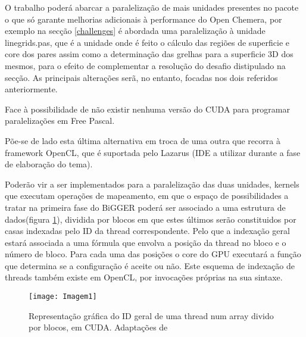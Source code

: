  O trabalho poderá abarcar a paralelização de mais unidades presentes no pacote o que só garante melhorias adicionais à performance do Open Chemera, por exemplo na secção \ref{challenges} é abordada uma paralelização à unidade linegrids.pas, que é a unidade onde é feito o cálculo das regiões de superficie e core dos pares assim como a determinação das grelhas para a superficie 3D dos mesmos, para o efeito de complementar a resolução do desafio distipulado na secção. As principais alterações serã, no entanto, focadas nos dois referidos anteriormente.
 
Face à possibilidade de não existir nenhuma versão do CUDA para programar paralelizações em Free Pascal. %

 Põe-se de lado esta última alternativa em troca de uma outra que recorra à framework OpenCL, que é suportada pelo Lazarus (IDE a utilizar durante a fase de elaboração do tema).
 
Poderão vir a ser implementados para a paralelização das duas unidades, kernels que executam operações de mapeamento, em que o espaço de possibilidades a tratar na primeira fase do BiGGER poderá ser associado a uma estrutura de dados(figura \ref{fig:fig3subfig}), dividida por blocos em que estes últimos serão constituidos por casas indexadas pelo ID da thread correspondente. Pelo que a indexação geral estará associada a uma fórmula que envolva a posição da thread no bloco e o número de bloco. Para cada uma das posições o core do GPU executará a função que determina se a configuração é aceite ou não.
Este esquema de indexação de threads também existe em OpenCL, por invocações próprias na sua sintaxe.
     \begin{figure}[ht]
  \centering
    {\texttt{[image: Imagem1]}}
  \caption{Representação gráfica do ID geral de uma thread num array divido por blocos, em CUDA. Adaptações de \cite{Sainio2010CUDAEASYA} \cite{zeller2011cuda}}
  \label{fig:fig3subfig}
\end{figure}

